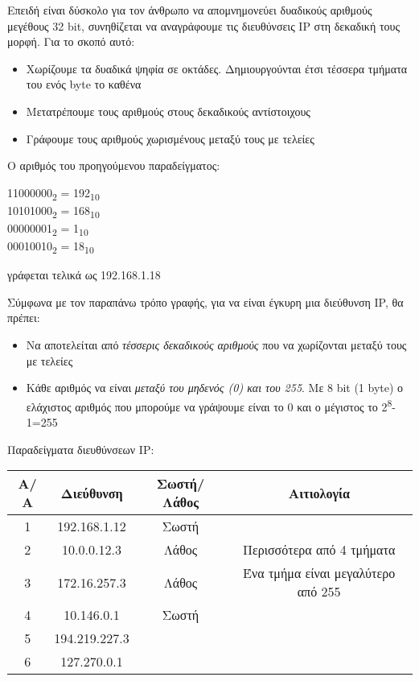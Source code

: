 Επειδή είναι δύσκολο για τον άνθρωπο να απομνημονεύει δυαδικούς αριθμούς μεγέθους 32 bit, συνηθίζεται να αναγράφουμε τις διευθύνσεις IP στη δεκαδική τους μορφή. Για το σκοπό αυτό:

\begin{itemize}
\item Χωρίζουμε τα δυαδικά ψηφία σε οκτάδες. Δημιουργούνται έτσι τέσσερα τμήματα του ενός byte το καθένα
\item Μετατρέπουμε τους αριθμούς στους δεκαδικούς αντίστοιχους
\item Γράφουμε τους αριθμούς χωρισμένους μεταξύ τους με τελείες
\end{itemize}

Ο αριθμός του προηγούμενου παραδείγματος:

11000000\textsubscript{2} = 192\textsubscript{10}\\
10101000\textsubscript{2} = 168\textsubscript{10}\\
00000001\textsubscript{2} = 1\textsubscript{10}\\
00010010\textsubscript{2} = 18\textsubscript{10}

γράφεται τελικά ως 192.168.1.18

Σύμφωνα με τον παραπάνω τρόπο γραφής, για να είναι έγκυρη μια διεύθυνση IP, θα πρέπει:

\begin{itemize}
\item Να αποτελείται από \emph{τέσσερις δεκαδικούς αριθμούς} που να χωρίζονται μεταξύ τους με τελείες
\item Κάθε αριθμός να είναι \emph{μεταξύ του μηδενός (0)  και του 255}. Με 8 bit (1 byte) ο ελάχιστος αριθμός που μπορούμε να γράψουμε είναι το 0 και ο μέγιστος το 2\textsuperscript{8}-1=255 
\end{itemize}

Παραδείγματα διευθύνσεων IP:

\begin{tabular}{|c|c|c|c|}
\hline
\rowcolor[gray]{0.95}
Α/Α & Διεύθυνση & Σωστή/Λάθος & Αιτιολογία\\
\hline
1 & 192.168.1.12 & Σωστή &  \\
\hline
2 & 10.0.0.12.3 & Λάθος & Περισσότερα από 4 τμήματα \\
\hline
3 & 172.16.257.3 & Λάθος & Ένα τμήμα είναι μεγαλύτερο από 255 \\
\hline
4 & 10.146.0.1 & Σωστή & \\
\hline
5 & 194.219.227.3 & & \\
\hline
6 & 127.270.0.1 & & \\
\hline
\end{tabular}

